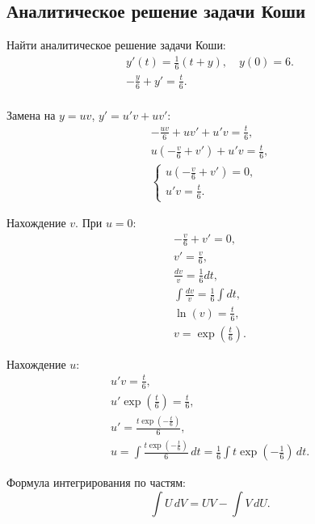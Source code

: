\documentclass[10pt, a4paper, titlepage]{article}
\begin{document}
\subsection*{Аналитическое решение задачи Коши}

Найти аналитическое решение задачи Коши:
\begin{gather*}
    y'(t)=\frac{1}{6}(t+y), \quad y(0)=6 .\\
    -\frac{y}{6}+y'=\frac{t}{6} .\\
\end{gather*}

Замена на $y=uv$, $y'=u'v+uv'$:
\begin{gather*}
    -\frac{uv}{6}+uv'+u'v=\frac{t}{6} ,\\
    u\left(-\frac{v}{6}+v'\right)+u'v = \frac{t}{6} ,\\
    \begin{cases}
        u\left(-\frac{v}{6}+v'\right)=0 ,\\
        u'v=\frac{t}{6} .
    \end{cases}
\end{gather*}

Нахождение $v$. При $u=0$:
\begin{gather*}
    -\frac{v}{6}+v'=0 ,\\
    v'=\frac{v}{6} ,\\
    \frac{dv}{v}=\frac{1}{6}dt ,\\
    \int\frac{dv}{v}=\frac{1}{6}\int dt ,\\
    \ln(v)=\frac{t}{6} ,\\
    v=\exp\left(\frac{t}{6}\right) .
\end{gather*}

Нахождение $u$:
\begin{gather*}
    u'v=\frac{t}{6} ,\\
    u'\exp\left(\frac{t}{6}\right)=\frac{t}{6} ,\\
    u'=\frac{t\exp\left(-\frac{t}{6}\right)}{6} ,\\
    u=\int\frac{t\exp\left(-\frac{t}{6}\right)}{6}\,dt = \frac{1}{6}\int t\exp\left(-\frac{1}{6}\right)\,dt .
\end{gather*}

Формула интегрирования по частям:
$$\int U\,dV = UV - \int V \,dU .$$
\end{document}
